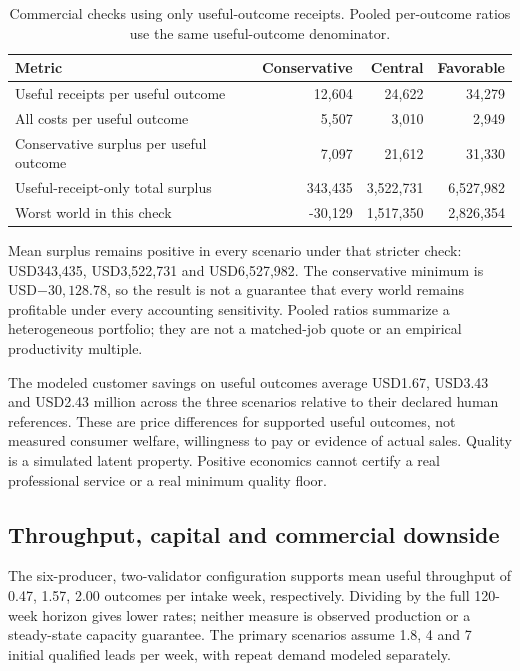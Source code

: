 \begin{table}[H]\centering\small\caption{Commercial checks using only useful-outcome receipts. Pooled per-outcome ratios use the same useful-outcome denominator.}

\begin{tabular}{lrrr}\toprule Metric & Conservative & Central & Favorable\\\midrule

Useful receipts per useful outcome & 12,604 & 24,622 & 34,279 \\

All costs per useful outcome & 5,507 & 3,010 & 2,949 \\

Conservative surplus per useful outcome & 7,097 & 21,612 & 31,330 \\

Useful-receipt-only total surplus & 343,435 & 3,522,731 & 6,527,982 \\

Worst world in this check & -30,129 & 1,517,350 & 2,826,354 \\

\bottomrule\end{tabular}\end{table}

Mean surplus remains positive in every scenario under that stricter check: USD343,435, USD3,522,731 and USD6,527,982. The conservative minimum is USD$-30,128.78$, so the result is not a guarantee that every world remains profitable under every accounting sensitivity. Pooled ratios summarize a heterogeneous portfolio; they are not a matched-job quote or an empirical productivity multiple.

The modeled customer savings on useful outcomes average USD1.67, USD3.43 and USD2.43 million across the three scenarios relative to their declared human references. These are price differences for supported useful outcomes, not measured consumer welfare, willingness to pay or evidence of actual sales. Quality is a simulated latent property. Positive economics cannot certify a real professional service or a real minimum quality floor.

\subsection{Throughput, capital and commercial downside}

The six-producer, two-validator configuration supports mean useful throughput of 0.47, 1.57, 2.00 outcomes per intake week, respectively. Dividing by the full 120-week horizon gives lower rates; neither measure is observed production or a steady-state capacity guarantee. The primary scenarios assume 1.8, 4 and 7 initial qualified leads per week, with repeat demand modeled separately.

